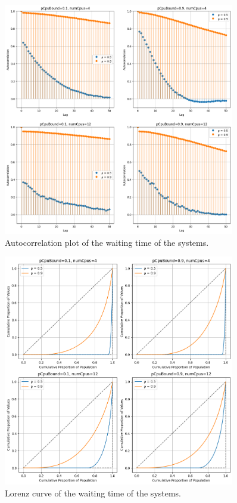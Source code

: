 \begin{figure}[H]
    \captionsetup{type=figure}
    \centering
    \includegraphics[width=0.9\textwidth]{./images/04/fcfs/wait/autocorrelation.png}
    \caption{Autocorrelation plot of the waiting time of the systems.}
    \label{fig:fcfsWaitAutocorrelation}
\end{figure}

\begin{figure}[H]
    \captionsetup{type=figure}
    \centering
    \includegraphics[width=0.9\textwidth]{./images/04/fcfs/wait/lorenz.png}
    \caption{Lorenz curve of the waiting time of the systems.}
    \label{fig:fcfsWaitLorenz}
\end{figure}


